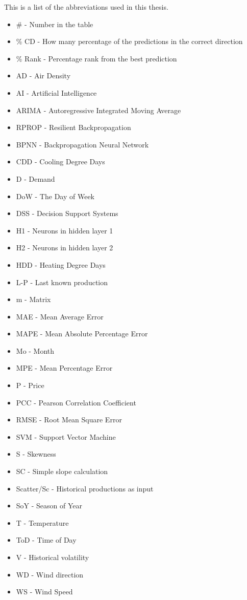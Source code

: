 This is a list of the abbreviations used in this thesis.

\begin{itemize}
	\item \# - Number in the table
	\item \% CD - How many percentage of the predictions in the correct direction  
	\item \% Rank - Percentage rank from the best prediction
	\item AD - Air Density
	\item AI - Artificial Intelligence
	\item ARIMA - Autoregressive Integrated Moving Average
	\item RPROP - Resilient Backpropagation
	\item BPNN - Backpropagation Neural Network
	\item CDD - Cooling Degree Days
	\item D - Demand
	\item DoW - The Day of Week
	\item DSS - Decision Support Systems
	\item H1 - Neurons in hidden layer 1
	\item H2 - Neurons in hidden layer 2
	\item HDD - Heating Degree Days
	\item L-P - Last known production
	\item m - Matrix
	\item MAE - Mean Average Error
	\item MAPE - Mean Absolute Percentage Error
	\item Mo - Month
	\item MPE - Mean Percentage Error
	\item P - Price
	\item PCC - Pearson Correlation Coefficient
	\item RMSE - Root Mean Square Error
	\item SVM - Support Vector Machine
	\item S - Skewness
	\item SC - Simple slope calculation
	\item Scatter/Sc - Historical productions as input
	\item SoY - Season of Year
	\item T - Temperature
	\item ToD - Time of Day
	\item V - Historical volatility
	\item WD - Wind direction
	\item WS - Wind Speed
\end{itemize}